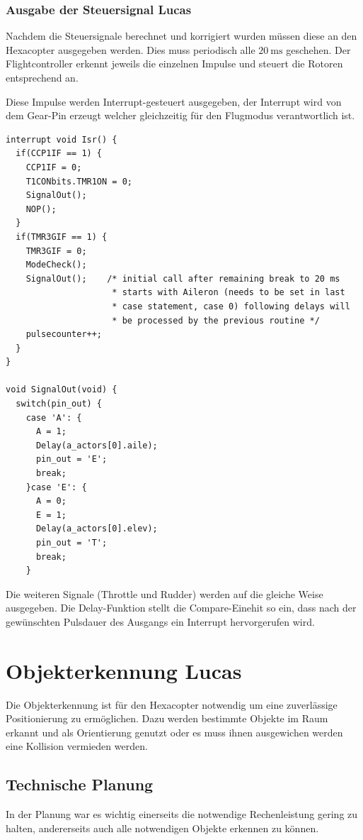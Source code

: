     \subsubsection{Ausgabe der Steuersignal Lucas}
    Nachdem die Steuersignale berechnet und korrigiert wurden müssen diese an den Hexacopter ausgegeben werden. Dies muss periodisch alle $\SI{20}{\milli\second}$ geschehen.
    Der Flightcontroller erkennt jeweils die einzelnen Impulse und steuert die Rotoren entsprechend an.

    Diese Impulse werden Interrupt-gesteuert ausgegeben, der Interrupt wird von dem Gear-Pin erzeugt welcher gleichzeitig für den Flugmodus verantwortlich ist.

    \lstset{language = c}
    \begin{lstlisting}
interrupt void Isr() {
  if(CCP1IF == 1) {
    CCP1IF = 0;
    T1CONbits.TMR1ON = 0;
    SignalOut();
    NOP();
  }
  if(TMR3GIF == 1) {
    TMR3GIF = 0;
    ModeCheck();
    SignalOut();    /* initial call after remaining break to 20 ms
                     * starts with Aileron (needs to be set in last
                     * case statement, case 0) following delays will
                     * be processed by the previous routine */
    pulsecounter++;
  }
}

void SignalOut(void) {
  switch(pin_out) {
    case 'A': {
      A = 1;
      Delay(a_actors[0].aile);
      pin_out = 'E';
      break;
    }case 'E': {
      A = 0;
      E = 1;
      Delay(a_actors[0].elev);
      pin_out = 'T';
      break;
    }
    \end{lstlisting}
    Die weiteren Signale (Throttle und Rudder) werden auf die gleiche Weise ausgegeben.
    Die Delay-Funktion stellt die Compare-Einehit so ein, dass nach der gewünschten Pulsdauer des Ausgangs ein Interrupt hervorgerufen wird.

\section{Objekterkennung Lucas}
Die Objekterkennung ist für den Hexacopter notwendig um eine zuverlässige Positionierung zu ermöglichen. Dazu werden bestimmte Objekte im Raum erkannt und als Orientierung
genutzt oder es muss ihnen ausgewichen werden \bzw eine Kollision vermieden werden.

  \subsection{Technische Planung}
  In der Planung war es wichtig einerseits die notwendige Rechenleistung gering zu halten, andererseits auch alle notwendigen Objekte erkennen zu können.

